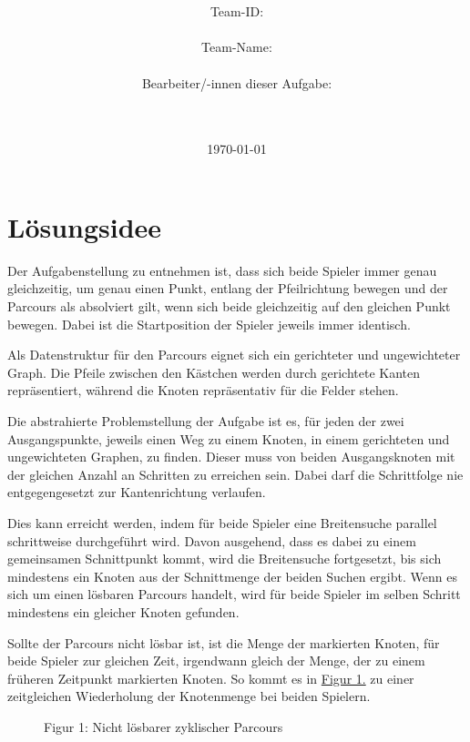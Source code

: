 \documentclass[a4paper,10pt,ngerman]{scrartcl}
\title{\textbf{\Huge\Aufgabe}}
\author{\LARGE Team-ID: \LARGE \TeamId \\\\
\LARGE Team-Name: \LARGE \TeamName \\\\
\LARGE Bearbeiter/-innen dieser Aufgabe: \\
\LARGE \Namen\\\\}
\date{\LARGE\today}
\begin{document}
    \maketitle
    \tableofcontents

    \vspace{0.5cm}


    \section{Lösungsidee}\label{sec:losungsidee}
    Der Aufgabenstellung zu entnehmen ist,
    dass sich beide Spieler immer genau gleichzeitig,
    um genau einen Punkt,
    entlang der Pfeilrichtung bewegen und der Parcours als absolviert gilt,
    wenn sich beide gleichzeitig auf den gleichen Punkt bewegen.
    Dabei ist die Startposition der Spieler jeweils immer identisch.

    Als Datenstruktur für den Parcours eignet sich ein gerichteter und ungewichteter Graph.
    Die Pfeile zwischen den Kästchen werden durch gerichtete Kanten repräsentiert,
    während die Knoten repräsentativ für die Felder stehen.

    Die abstrahierte Problemstellung der Aufgabe ist es,
    für jeden der zwei Ausgangspunkte,
    jeweils einen Weg zu einem Knoten,
    in einem gerichteten und ungewichteten Graphen,
    zu finden.
    Dieser muss von beiden Ausgangsknoten mit der gleichen Anzahl an Schritten zu erreichen sein.
    Dabei darf die Schrittfolge nie entgegengesetzt zur Kantenrichtung verlaufen.

    Dies kann erreicht werden,
    indem für beide Spieler eine Breitensuche parallel schrittweise durchgeführt wird.
    Davon ausgehend, dass es dabei zu einem gemeinsamen Schnittpunkt kommt,
    wird die Breitensuche fortgesetzt,
    bis sich mindestens ein Knoten aus der Schnittmenge der beiden Suchen ergibt.
    Wenn es sich um einen lösbaren Parcours handelt,
    wird für beide Spieler im selben Schritt mindestens ein gleicher Knoten gefunden.

    Sollte der Parcours nicht lösbar ist,
    ist die Menge der markierten Knoten,
    für beide Spieler zur gleichen Zeit,
    irgendwann gleich der Menge,
    der zu einem früheren Zeitpunkt markierten Knoten.
    So kommt es in \hyperref[fig:Figure1]{Figur 1.}
    zu einer zeitgleichen Wiederholung der Knotenmenge bei beiden Spielern.

    \begin{figure}
        \centering
        \FigurEins{}
        \caption{Figur 1: Nicht lösbarer zyklischer Parcours}
        \label{fig:Figure1}
    \end{figure}
\end{document}
